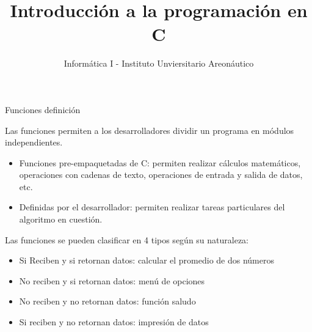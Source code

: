 \documentclass[xcolor=pdftex,table,11pt]{beamer}
\author{Informática I - Instituto Unviersitario Areonáutico}
\title{Introducción a la programación en C}
\begin{document}
\begin{frame}
\titlepage
\end{frame}

\begin{frame}
\tableofcontents
\end{frame}






\begin{frame}{Funciones definición}
\begin{block}{}
Las funciones permiten a los desarrolladores dividir un programa en módulos independientes.\\
\begin{itemize}
\item Funciones pre-empaquetadas de C: permiten realizar cálculos matemáticos, operaciones con cadenas de texto, operaciones de entrada y salida de datos, etc.
\item Definidas por el desarrollador: permiten realizar tareas particulares del algoritmo en cuestión.
\end{itemize}

Las funciones se pueden clasificar en 4 tipos según su naturaleza:
\begin{itemize}
\item Si Reciben y si retornan datos: calcular el promedio de dos números
\item No reciben y si retornan datos: menú de opciones
\item No reciben y no retornan datos: función saludo
\item Si reciben y no retornan datos: impresión de datos


\end{itemize}
\end{block}
\end{frame}
\end{document}
